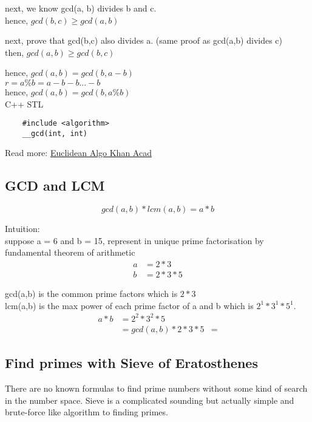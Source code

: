 \documentclass[12pt]{article}
\begin{document}
next, we know gcd(a, b) divides b and c. \\
hence, \(gcd(b, c) \geq gcd(a, b) \)

next, prove that gcd(b,c) also divides a. (same proof as gcd(a,b) divides c) \\
then, \(gcd(a,b) \geq gcd(b,c)\) 

hence, \(gcd(a,b) = gcd(b,a - b)\) \\ 
\( r = a \% b = a - b - b ... - b \) \\ 
hence, \(gcd(a,b) = gcd(b, a \% b) \) \\ [\baselineskip] 

C++ STL  
\begin{verbatim}
	#include <algorithm> 
 	__gcd(int, int)
\end{verbatim} 

Read more: \href{https://www.khanacademy.org/computing/computer-science/cryptography/modarithmetic/a/the-euclidean-algorithm}{Euclidean Algo Khan Acad} 

\subsection{GCD and LCM}
\[ gcd(a, b) * lcm(a, b) = a * b \]

Intuition: \\ 

suppose a = 6 and b = 15, represent in unique prime factorisation by fundamental theorem of arithmetic 
\begin{align} 
a &= 2 * 3 \\
b &= 2 * 3 * 5 
\end{align} 

gcd(a,b) is the common prime factors which is \(2 * 3\) \\
lcm(a,b) is the max power of each prime factor of a and b which is \(2^1 * 3^1 * 5^1\). \\ 

\begin{align} 
a * b &= 2^2 * 3^2 * 5 \\
&= gcd(a, b) * 2 * 3 * 5
&= 
\end{align} 

\subsection{Find primes with Sieve of Eratosthenes} 
There are no known formulas to find prime numbers without some kind of search in the number space. 
Sieve is a complicated sounding but actually simple and brute-force like algorithm to finding primes. 
\end{document}
